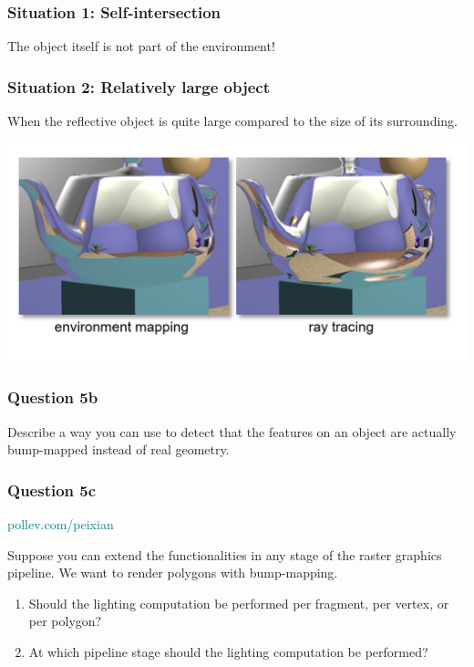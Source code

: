 \documentclass{beamer}
\begin{document}
\begin{frame}
    \frametitle{Situation 1: Self-intersection}

    The object itself is not part of the environment!

\end{frame}

\begin{frame}
    \frametitle{Situation 2: Relatively large object}

    When the reflective object is quite large compared to the size of its surrounding.
    
    \begin{center}
        \includegraphics[scale=0.5]{env-inaccuracy.png}
    \end{center}

\end{frame}

\begin{frame}
    \frametitle{Question 5b}

    Describe a way you can use to detect that the features on an object are actually bump-mapped 
    instead of real geometry.

\end{frame}

\begin{frame}
    \frametitle{Question 5c}

    \begin{tcolorbox}[colback=teal!5!white]
        \textcolor{teal}{pollev.com/peixian}
    \end{tcolorbox}

    Suppose you can extend the functionalities in any stage of the raster graphics pipeline. 
    We want to render polygons with bump-mapping. 

    \begin{enumerate}
        \item Should the lighting computation be performed per fragment, per vertex, or per polygon?
        \item At which pipeline stage should the lighting computation be performed?
    \end{enumerate}

\end{frame}
\end{document}
